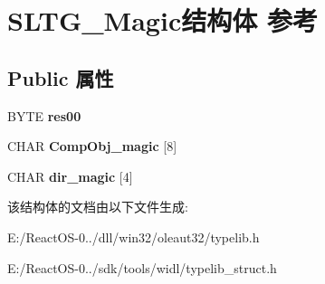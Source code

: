 \hypertarget{struct_s_l_t_g___magic}{}\section{S\+L\+T\+G\+\_\+\+Magic结构体 参考}
\label{struct_s_l_t_g___magic}
\subsection*{Public 属性}
\begin{DoxyCompactItemize}
\item 
\mbox{\label{struct_s_l_t_g___magic_aaaee2287b77676264774c0193127e536}} 
B\+Y\+TE {\bfseries res00}
\item 
\mbox{\label{struct_s_l_t_g___magic_a73a878722c96d4b45e8c2f17e34fd411}} 
C\+H\+AR {\bfseries Comp\+Obj\+\_\+magic} \mbox{[}8\mbox{]}
\item 
\mbox{\label{struct_s_l_t_g___magic_a6528fbf1dbc0bb79006fcf93bc3f4e7d}} 
C\+H\+AR {\bfseries dir\+\_\+magic} \mbox{[}4\mbox{]}
\end{DoxyCompactItemize}


该结构体的文档由以下文件生成\+:\begin{DoxyCompactItemize}
\item 
E\+:/\+React\+O\+S-\/0../dll/win32/oleaut32/typelib.\+h\item 
E\+:/\+React\+O\+S-\/0../sdk/tools/widl/typelib\+\_\+struct.\+h\end{DoxyCompactItemize}
